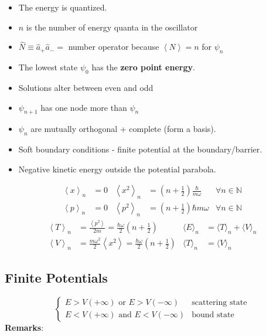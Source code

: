 \begin{itemize}
    \item The energy is quantized.
    \item $n$ is the number of energy quanta in the oscillator
    \item $\widehat{N} \equiv \widehat{a}_{+}\widehat{a}_{-} = $ number operator because $\left<N\right> = n$ for $\psi_n$
    \item The lowest state $\psi_0$ has the \textbf{zero point energy}. %
    \item Solutions alter between even and odd%
    \item $\psi_{n+1}$ has one node more than $\psi_n$
    \item $\psi_n$ are mutually orthogonal + complete (form a basis).
    \item Soft boundary conditions - finite potential at the boundary/barrier.
    \item Negative kinetic energy outside the potential parabola.
\end{itemize}

\noindent\begin{align*}
    \left\langle x \right\rangle _n & = 0 & \left\langle x^2 \right\rangle _n & = \left(n+\frac{1}{2}\right)\frac{\hbar}{m\omega} & \forall n \in \mathbb{N} \\
    \left\langle p \right\rangle _n & = 0 & \left\langle p^2 \right\rangle _n & = \left(n+\frac{1}{2}\right)\hbar m\omega         & \forall n \in \mathbb{N}
\end{align*}
\noindent\begin{align*}
    \left\langle T \right\rangle _n & = \frac{\left\langle p^2 \right\rangle}{2m} =  \frac{\hbar \omega}{2}\left(n+\frac{1}{2}\right)        & \langle E\rangle_n & =  \langle T\rangle_n +\langle V\rangle_n \\
    \left\langle V \right\rangle _n & = \frac{m\omega^2}{2}\left\langle x^2 \right\rangle = \frac{\hbar \omega}{2}\left(n+\frac{1}{2}\right) & \langle T\rangle_n & =  \langle V\rangle_n
\end{align*}

\subsection{Finite Potentials}
\noindent\begin{equation*}
    \begin{cases}
        E > V(+\infty)\text{ or } E > V(-\infty)  & \text{scattering state} \\
        E < V(+\infty)\text{ and } E < V(-\infty) & \text{bound state}
    \end{cases}
\end{equation*}
\textbf{Remarks}:

